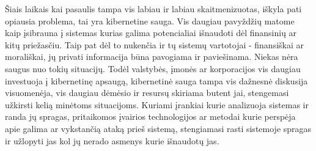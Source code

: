 Šiais laikais kai pasaulis tampa vis labiau ir labiau skaitmenizuotas, iškyla pati opiausia problema, tai yra kibernetine sauga. Vis daugiau pavyždžių matome kaip įsibrauna į sistemas kurias
galima potencialiai išnaudoti dėl finansinių ar kitų priežasčiu. Taip pat dėl to nukenčia ir tų sistemų
vartotojai - finansiškai ar morališkai, jų privati informacija būna pavogiama ir paviešinama. Niekas nėra saugus nuo tokių situacijų. Todėl valstybės, įmonės ar korporacijos vis daugiau investuoja
į kibernetinę apsaugą, kibernetinė sauga tampa vis dažnesnė diskusija visuomenėja, vis daugiau
dėmėsio ir resursų skiriama butent jai, stengemasi užkirsti kelią minėtoms situacijoms. Kuriami
įrankiai kurie analizuoja sistemas ir randa jų spragas, pritaikomos įvairios technologijos ar metodai
kurie perspėja apie galima ar vykstančią ataką prieš sistemą, stengiamasi rasti sistemoje spragas ir
užlopyti jas kol jų nerado asmenys kurie išnaudotų jas.